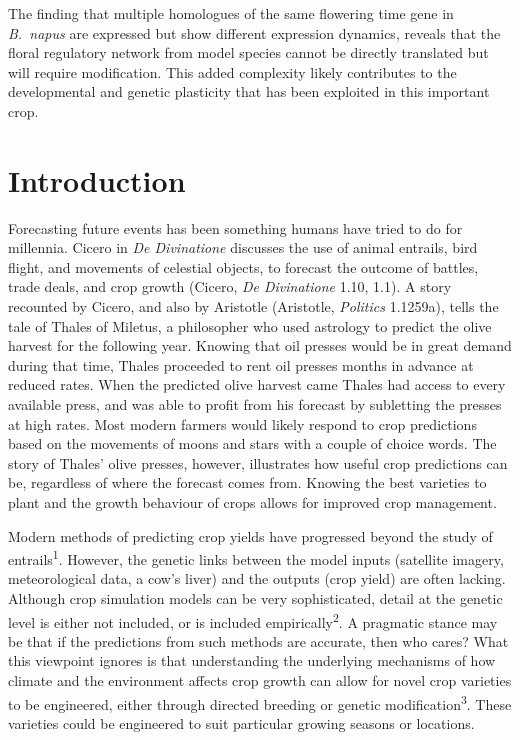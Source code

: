 \documentclass[12pt,]{book}
\begin{document}
The finding that multiple homologues of the same flowering time gene in
\emph{B.~napus} are expressed but show different expression dynamics,
reveals that the floral regulatory network from model species cannot be
directly translated but will require modification. This added complexity
likely contributes to the developmental and genetic plasticity that has
been exploited in this important crop.

\chapter{Introduction}\label{chapter:introduction}

Forecasting future events has been something humans have tried to do for
millennia. Cicero in \emph{De Divinatione} discusses the use of animal
entrails, bird flight, and movements of celestial objects, to forecast
the outcome of battles, trade deals, and crop growth (Cicero, \emph{De
Divinatione} 1.10, 1.1). A story recounted by Cicero, and also by
Aristotle (Aristotle, \emph{Politics} 1.1259a), tells the tale of Thales
of Miletus, a philosopher who used astrology to predict the olive
harvest for the following year. Knowing that oil presses would be in
great demand during that time, Thales proceeded to rent oil presses
months in advance at reduced rates. When the predicted olive harvest
came Thales had access to every available press, and was able to profit
from his forecast by subletting the presses at high rates. Most modern
farmers would likely respond to crop predictions based on the movements
of moons and stars with a couple of choice words. The story of Thales'
olive presses, however, illustrates how useful crop predictions can be,
regardless of where the forecast comes from. Knowing the best varieties
to plant and the growth behaviour of crops allows for improved crop
management.

Modern methods of predicting crop yields have progressed beyond the
study of entrails\textsuperscript{1}. However, the genetic links between
the model inputs (satellite imagery, meteorological data, a cow's liver)
and the outputs (crop yield) are often lacking. Although crop simulation
models can be very sophisticated, detail at the genetic level is either
not included, or is included empirically\textsuperscript{2}. A pragmatic
stance may be that if the predictions from such methods are accurate,
then who cares? What this viewpoint ignores is that understanding the
underlying mechanisms of how climate and the environment affects crop
growth can allow for novel crop varieties to be engineered, either
through directed breeding or genetic modification\textsuperscript{3}.
These varieties could be engineered to suit particular growing seasons
or locations.
\end{document}
